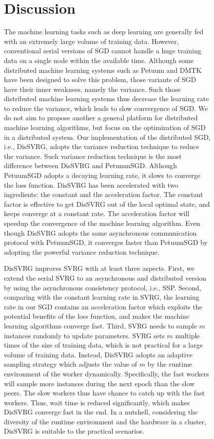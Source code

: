 \documentclass[preprint,review,11pt,a4paper]{elsarticle}
\begin{document}
\begin{figure}
\section{Discussion}
\label{discussion}
The machine learning tasks such as deep learning are generally fed with an extremely large volume of training data. However, conventional serial versions of SGD  cannot handle a huge training data on a single node within the available time. Although some distributed machine learning systems such as Petuum \cite{Xing:2015ib} and DMTK\cite{Yuan:2015ka} have been designed to solve this problem, those variants of SGD have their inner weakness, namely the variance. Such those distributed machine learning systems thus decrease the learning rate to reduce the variance, which leads to slow convergence of SGD. We do not aim to propose another a general platform for distributed machine learning algorithms, but focus on the optimization of SGD in a distributed system. Our implementation of the distributed SGD, i.e., DisSVRG, adopts the variance reduction technique to reduce the variance. Such variance reduction technique is the most difference between DisSVRG and PetummSGD. Although PetuumSGD  adopts a decaying learning rate, it slows to converge the loss function. DisSVRG has been accelerated with two ingredients: the constant and the acceleration factor. The constant factor is effective to get DisSVRG out of the local optimal state, and keeps converge at a constant rate. The acceleration factor will speedup the convergence of the machine learning algorithm. Even though DisSVRG adopts the same asynchronous communication protocol with PetuumSGD, it converges faster than PetuumSGD by adopting the powerful variance reduction technique.

DisSVRG improves SVRG with at least three aspects. First, we extend the serial SVRG to an asynchronous and distributed version by using the asynchronous consistency protocol, i.e., SSP. Second, comparing with the constant learning rate in SVRG, the learning rate in our SGD contains an acceleration factor which exploits the potential benefits of the loss function, and makes the machine learning algorithms converge fast. Third, SVRG needs to sample $m$ instances randomly to update parameters. SVRG sets $m$ multiple times of the size of training data, which is not practical for a large volume of training data. Instead, DisSVRG adopts an adaptive sampling strategy which adjusts the value of $m$ by the runtime environment of the worker dynamically. Specifically, the fast workers will sample more instances during the next epoch than the slow peers. The slow workers thus have chance to catch up with the fast workers. Thus, wait time is reduced significantly, which makes DisSVRG converge fast in the end. In a nutshell, considering the diversity of the runtime environment and the hardware in a cluster, DisSVRG is suitable to the practical scenarios.


\end{figure}
\end{document}
